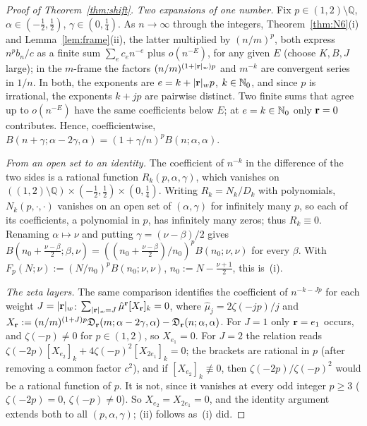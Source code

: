 \begin{proof}[Proof of Theorem~\ref{thm:shift}]
\emph{Two expansions of one number.} Fix $p\in(1,2)\setminus\mathbb Q$, $\alpha\in(-\frac12,\frac12)$, $\gamma\in(0,\frac14)$. As $n\to\infty$
through the integers, Theorem~\ref{thm:N6}(i) and Lemma~\ref{lem:frame}(ii), the latter multiplied by $(n/m)^p$, both express
$n^pb_n/c$ as a finite sum $\sum_ec_en^{-e}$ plus $o(n^{-E})$, for any given $E$ (choose $K,B,J$ large); in the $m$-frame the factors
$(n/m)^{(1+|\mathbf r|_w)p}$ and $m^{-k}$ are convergent series in $1/n$. In both, the exponents are $e=k+|\mathbf r|_wp$, $k\in\mathbb{N}_0$, and since $p$
is irrational, the exponents $k+jp$ are pairwise distinct. Two finite sums that agree up to $o(n^{-E})$ have the same
coefficients below $E$; at $e=k\in\mathbb{N}_0$ only $\mathbf r=0$ contributes. Hence, coefficientwise,
$B(n+\gamma;\alpha-2\gamma,\alpha)=(1+\gamma/n)^pB(n;\alpha,\alpha)$.

\emph{From an open set to an identity.} The coefficient of $n^{-k}$ in the difference of the two sides is a rational function
$R_k(p,\alpha,\gamma)$, which vanishes on $((1,2)\setminus\mathbb Q)\times(-\frac12,\frac12)\times(0,\frac14)$. Writing $R_k=N_k/D_k$ with
polynomials, $N_k(p,\cdot,\cdot)$ vanishes on an open set of $(\alpha,\gamma)$ for infinitely many $p$, so each of its coefficients, a
polynomial in $p$, has infinitely many zeros; thus $R_k\equiv0$. Renaming $\alpha\mapsto\nu$ and putting $\gamma=(\nu-\beta)/2$ gives
$B(n_0+\frac{\nu-\beta}2;\beta,\nu)=((n_0+\frac{\nu-\beta}2)/n_0)^pB(n_0;\nu,\nu)$ for every $\beta$. With
$F_p(N;\nu):=(N/n_0)^pB(n_0;\nu,\nu)$, $n_0:=N-\frac{\nu+1}2$, this is~(i).

\emph{The zeta layers.} The same comparison identifies the coefficient of $n^{-k-Jp}$ for each weight $J=|\mathbf r|_w$:
$\sum_{|\mathbf r|_w=J}\hat\mu^{\mathbf r}[X_{\mathbf r}]_k=0$, where $\hat\mu_j=2\zeta(-jp)/j$ and $X_{\mathbf r}:=(n/m)^{(1+J)p}\mathfrak D_{\mathbf r}(m;\alpha-2\gamma,\alpha)-\mathfrak D_{\mathbf r}(n;\alpha,\alpha)$.
For $J=1$ only $\mathbf r=e_1$ occurs, and $\zeta(-p)\ne0$ for $p\in(1,2)$, so $X_{e_1}=0$. For $J=2$ the relation reads
$\zeta(-2p)[X_{e_2}]_k+4\zeta(-p)^2[X_{2e_1}]_k=0$; the brackets are rational in $p$ (after removing a common factor $c^2$), and if
$[X_{e_2}]_k\not\equiv0$, then $\zeta(-2p)/\zeta(-p)^2$ would be a rational function of $p$. It is not, since it vanishes at every odd
integer $p\ge3$ ($\zeta(-2p)=0$, $\zeta(-p)\ne0$). So $X_{e_2}=X_{2e_1}=0$, and the identity argument extends both to all
$(p,\alpha,\gamma)$; (ii) follows as~(i) did.
\end{proof}

